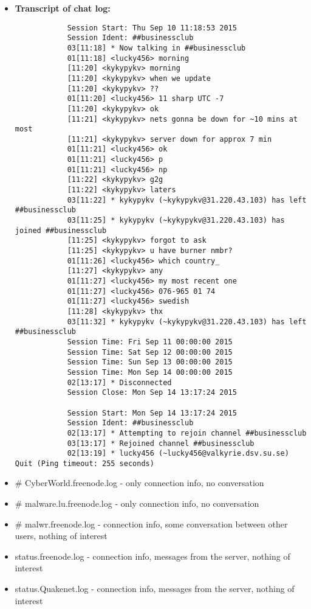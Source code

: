 \begin{enumerate}
\begin{itemize}
\begin{itemize}
\begin{itemize}
		 	\item \textbf{Transcript of chat log:}
		 	\begin{verbatim} 	
		 	Session Start: Thu Sep 10 11:18:53 2015
		 	Session Ident: ##businessclub
		 	03[11:18] * Now talking in ##businessclub
		 	01[11:18] <lucky456> morning
		 	[11:20] <kykypykv> morning
		 	[11:20] <kykypykv> when we update
		 	[11:20] <kykypykv> ??
		 	01[11:20] <lucky456> 11 sharp UTC -7
		 	[11:20] <kykypykv> ok
		 	[11:21] <kykypykv> nets gonna be down for ~10 mins at most
		 	[11:21] <kykypykv> server down for approx 7 min
		 	01[11:21] <lucky456> ok 
		 	01[11:21] <lucky456> p
		 	01[11:21] <lucky456> np
		 	[11:22] <kykypykv> g2g
		 	[11:22] <kykypykv> laters
		 	03[11:22] * kykypykv (~kykypykv@31.220.43.103) has left ##businessclub
		 	03[11:25] * kykypykv (~kykypykv@31.220.43.103) has joined ##businessclub
		 	[11:25] <kykypykv> forgot to ask
		 	[11:25] <kykypykv> u have burner nmbr?
		 	01[11:26] <lucky456> which country_
		 	[11:27] <kykypykv> any
		 	01[11:27] <lucky456> my most recent one
		 	01[11:27] <lucky456> 076-965 01 74 
		 	01[11:27] <lucky456> swedish
		 	[11:28] <kykypykv> thx
		 	03[11:32] * kykypykv (~kykypykv@31.220.43.103) has left ##businessclub
		 	Session Time: Fri Sep 11 00:00:00 2015
		 	Session Time: Sat Sep 12 00:00:00 2015
		 	Session Time: Sun Sep 13 00:00:00 2015
		 	Session Time: Mon Sep 14 00:00:00 2015
		 	02[13:17] * Disconnected
		 	Session Close: Mon Sep 14 13:17:24 2015
		 	
		 	Session Start: Mon Sep 14 13:17:24 2015
		 	Session Ident: ##businessclub
		 	02[13:17] * Attempting to rejoin channel ##businessclub
		 	03[13:17] * Rejoined channel ##businessclub
		 	02[13:19] * lucky456 (~lucky456@valkyrie.dsv.su.se) Quit (Ping timeout: 255 seconds)
		 	\end{verbatim}
		 	
		 	\item \# CyberWorld.freenode.log - only connection info, no conversation
		 	\item \# malware.lu.freenode.log - only connection info, no conversation
		 	\item \# malwr.freenode.log - connection info, some conversation between other users, nothing of interest
		 	\item status.freenode.log - connection info, messages from the server, nothing of interest
		 	\item status.Quakenet.log - connection info, messages from the server, nothing of interest
		 	

\end{itemize}
\end{itemize}
\end{itemize}
\end{enumerate}
